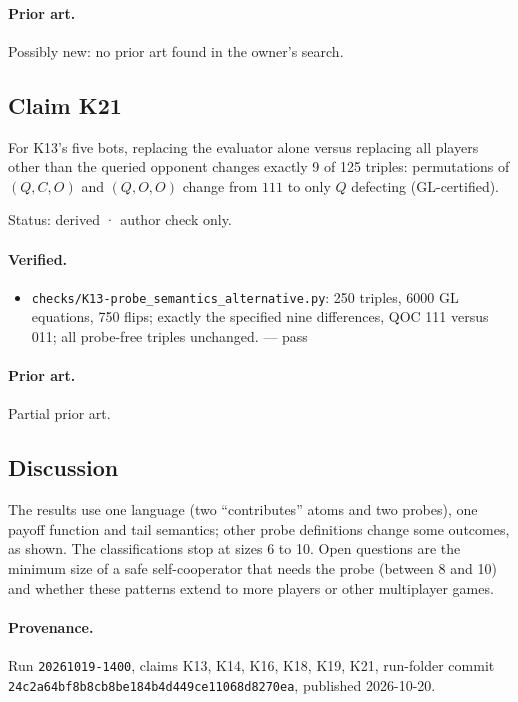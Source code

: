 \documentclass{article}
\begin{document}
\paragraph{Prior art.} Possibly new: no prior art found in the owner's search.

\subsection*{Claim K21}

For K13’s five bots, replacing the evaluator alone versus replacing all players other than the queried opponent changes exactly 9 of 125 triples: permutations of $(Q,C,O)$ and $(Q,O,O)$ change from $111$ to only $Q$ defecting (GL-certified).

Status: derived · author check only.

\paragraph{Verified.}
\begin{itemize}
\item \texttt{checks/K13-probe\_semantics\_alternative.py}: 250 triples, 6000 GL equations, 750 flips; exactly the specified nine differences, QOC 111 versus 011; all probe-free triples unchanged. --- pass
\end{itemize}

\paragraph{Prior art.} Partial prior art.

\subsection*{Discussion}

The results use one language (two ``contributes'' atoms and two probes), one payoff function and
tail semantics; other probe definitions change some outcomes, as shown. The classifications stop
at sizes 6 to 10. Open questions are the minimum size of a safe self-cooperator that needs the
probe (between 8 and 10) and whether these patterns extend to more players or other multiplayer
games.

\paragraph{Provenance.}
Run \texttt{20261019-1400}, claims K13, K14, K16, K18, K19, K21, run-folder commit \texttt{24c2a64bf8b8cb8be184b4d449ce11068d8270ea}, published 2026-10-20.
\end{document}
